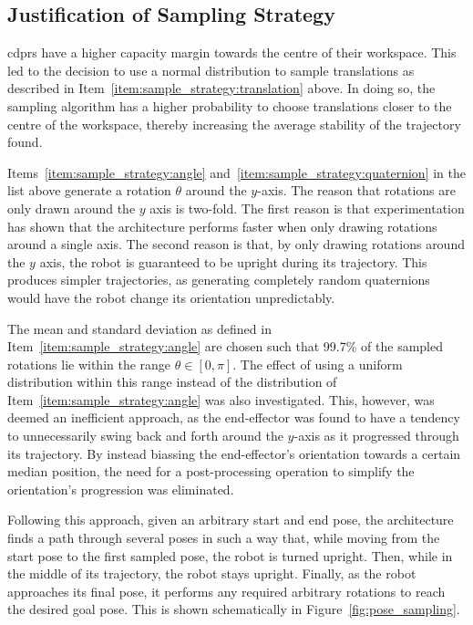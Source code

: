 		\subsection{Justification of Sampling Strategy}%
		\label{sec:justification_of_sampling_strategy}

			\glspl{cdpr} have a higher capacity margin towards the centre of
			their workspace. This led to the decision
			to use a normal distribution to sample translations as described in
			Item~\ref{item:sample_strategy:translation} above. In doing so,
			the sampling algorithm has a higher probability to choose
			translations closer to the centre of the workspace, thereby
			increasing the average stability of the trajectory found.

			Items~\ref{item:sample_strategy:angle}
			and~\ref{item:sample_strategy:quaternion} in the list above generate
			a rotation $\theta$ around the $y$-axis. The reason that rotations
			are only drawn around the $y$ axis is two-fold. The first reason is
			that experimentation has shown that the architecture performs faster
			when only drawing rotations around a single axis. The second reason is that, by only drawing rotations
			around the $y$ axis, the robot is guaranteed to be upright during
			its trajectory. This produces simpler trajectories, as generating
			completely random quaternions would have the robot change its
			orientation unpredictably.

			The mean and standard deviation as defined in
			Item~\ref{item:sample_strategy:angle} are chosen such that 99.7\% of
			the sampled rotations lie within the range $\theta \in [0, \pi]$.
			The effect of using a uniform distribution within this range instead
			of the distribution of Item~\ref{item:sample_strategy:angle} was
			also investigated. This, however, was deemed an inefficient
			approach, as the end-effector was found to have a tendency to
			unnecessarily swing back and forth around the $y$-axis as it
			progressed through its trajectory. By instead biassing the
			end-effector's orientation towards a certain median position, the
			need for a post-processing operation to simplify the orientation's
			progression was eliminated.

			Following this approach, given an arbitrary start and end pose, the
			architecture finds a path through several poses in such a way that,
			while moving from the start pose to the first sampled pose, the
			robot is turned upright. Then, while in the middle of its
			trajectory, the robot stays upright. Finally, as the robot
			approaches its final pose, it performs any required arbitrary
			rotations to reach the desired goal pose. This is shown
			schematically in Figure~\ref{fig:pose_sampling}.

